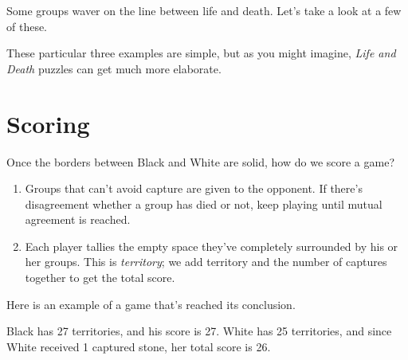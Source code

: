\documentclass{article}
\begin{document}
Some groups waver on the line between life and death.  Let's take a
look at a few of these.
\begin{center}
\hspace{.3in}
\hspace{.3in}
\end{center}
These particular three examples are simple, but as you might imagine,
\emph{Life and Death} puzzles can get much more elaborate.



\section*{Scoring}

Once the borders between Black and White are solid, how do we score a game?
\begin{enumerate}
\item Groups that can't avoid capture are given to the opponent.  If
there's disagreement whether a group has died or not, keep playing
until mutual agreement is reached.

\item Each player tallies the empty space they've completely surrounded
  by his or her groups.  This is \emph{territory}; we add territory
  and the number of captures together to get the total score.
\end{enumerate}
%
Here is an example of a game that's reached its conclusion.
\begin{center}
\hspace{.3in}
\hspace{.3in}
\end{center}
Black has 27 territories, and his score is 27.  White has 25
territories, and since White received 1 captured stone, her total
score is 26.
\end{document}
